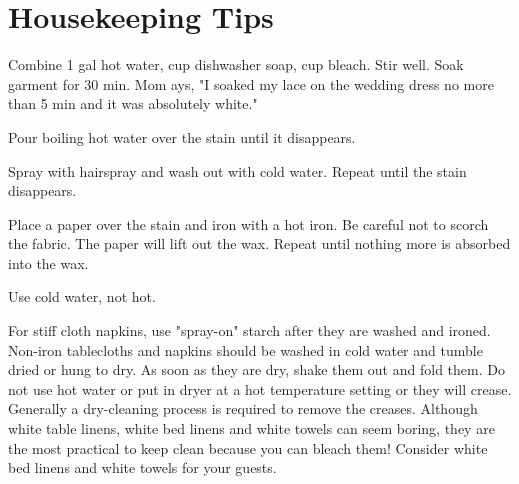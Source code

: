 \chapter*{Housekeeping Tips}

 \par
\begin{minipage}{\linewidth}
Combine 1 gal hot water,  cup dishwasher soap,  cup bleach. Stir well. Soak garment for 30 min.  Mom ays, "I soaked my lace on the wedding dress no more than 5 min and it was absolutely white."
\end{minipage}\par

\begin{minipage}{\linewidth}
Pour boiling hot water over the stain until it disappears.
\end{minipage}\par

\begin{minipage}{\linewidth}
Spray with hairspray and wash out with cold water. Repeat until the stain disappears.
\end{minipage}\par

\begin{minipage}{\linewidth}
Place a paper over the stain and iron with a hot iron. Be careful not to scorch the fabric. The paper will lift out the wax. Repeat until nothing more is absorbed into the wax.
\end{minipage}\par

\begin{minipage}{\linewidth}
Use cold water, not hot.
\end{minipage}\par

\begin{minipage}{\linewidth}
For stiff cloth napkins, use "spray-on" starch after they are washed and ironed.
Non-iron tablecloths and napkins should be washed in cold water and tumble dried or hung to dry. As soon as they are dry, shake them out and fold them. Do not use hot water or put in dryer at a hot temperature setting or they will crease. Generally a dry-cleaning process is required to remove the creases.
Although white table linens, white bed linens and white towels can seem boring, they are the most practical to keep clean because you can bleach them! Consider white bed linens and white towels for your guests.
\end{minipage}\par

